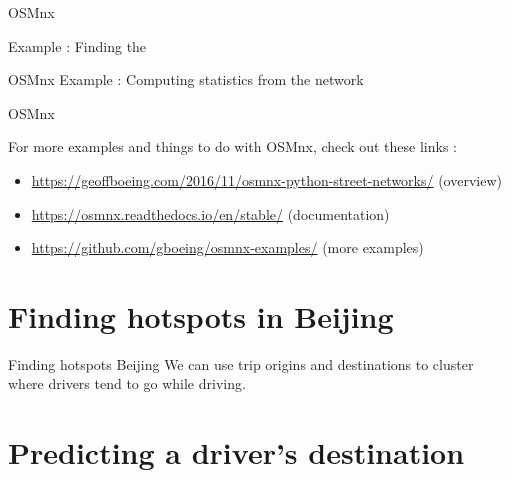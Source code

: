 \documentclass[aspectratio=169]{beamer}
\begin{document}
\begin{frame}{OSMnx \cite{boeing2017osmnx}}

{\Large Example : Finding the }
{\small }

\begin{frame}{OSMnx \cite{boeing2017osmnx}}
\vspace{.3cm}
{\Large Example : Computing statistics from the network}
{\small }
\centering


\end{frame}

\begin{frame}{OSMnx \cite{boeing2017osmnx}}

{\Large For more examples and things to do with OSMnx, check out these links :}
\vspace{1cm}
\begin{itemize}
	\item \url{https://geoffboeing.com/2016/11/osmnx-python-street-networks/} (overview)
	\item \url{https://osmnx.readthedocs.io/en/stable/} (documentation)
	\item \url{https://github.com/gboeing/osmnx-examples/} (more examples)
\end{itemize}

\end{frame}


\section{Finding hotspots in Beijing}

\begin{frame}{Finding hotspots Beijing}
    We can use trip origins and destinations to cluster where drivers tend to go while driving.
\end{frame}


\section{Predicting a driver's destination}


\end{frame}
\end{document}
